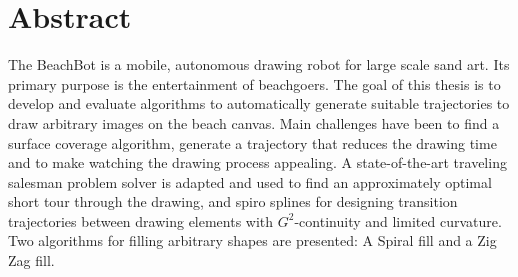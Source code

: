 \chapter*{Abstract}

The BeachBot is a mobile, autonomous drawing robot for large scale sand art. Its primary purpose is the entertainment of beachgoers. The goal of this thesis is to develop and evaluate algorithms to automatically generate suitable trajectories to draw arbitrary images on the beach canvas. Main challenges have been to find a surface coverage algorithm, generate a trajectory that reduces the drawing time and to make watching the drawing process appealing. A state-of-the-art traveling salesman problem solver is adapted and used to find an approximately optimal short tour through the drawing, and spiro splines for designing transition trajectories between drawing elements with $G^2$-continuity and limited curvature. Two algorithms for filling arbitrary shapes are presented: A Spiral fill and a Zig Zag fill.

